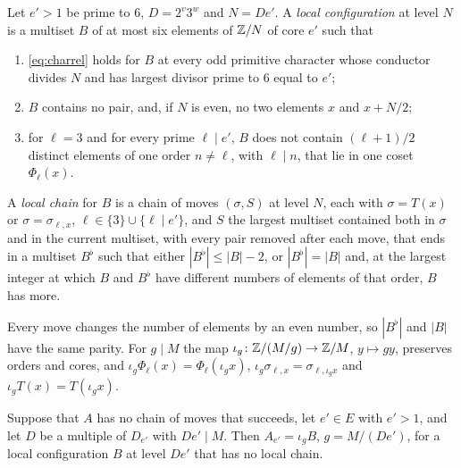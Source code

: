 \begin{definition}\label{def:localconf}
Let $e'>1$ be prime to $6$, $D=2^{v}3^{w}$ and $N=De'$. A \emph{local
configuration} at level $N$ is a multiset $B$ of at most six elements of
$\mathbb{Z}/N$ of core $e'$ such that
\begin{enumerate}[label=\textup{(\roman*)}]
\item \eqref{eq:charrel} holds for $B$ at every odd primitive character
whose conductor divides $N$ and has largest divisor prime to $6$ equal to
$e'$;
\item $B$ contains no pair, and, if $N$ is even, no two elements $x$ and
$x+N/2$;
\item for $\ell=3$ and for every prime $\ell\mid e'$, $B$ does not contain
$(\ell+1)/2$ distinct elements of one order $n\ne\ell$, with $\ell\mid n$,
that lie in one coset $\Phi_{\ell}(x)$.
\end{enumerate}
A \emph{local chain} for $B$ is a chain of moves $(\sigma,S)$ at level $N$,
each with $\sigma=T(x)$ or $\sigma=\sigma_{\ell,x}$, $\ell\in\{3\}\cup
\{\ell\mid e'\}$, and $S$ the largest multiset contained both in $\sigma$ and in
the current multiset, with every pair removed after each move, that ends in a multiset
$B^{\flat}$ such that either $|B^{\flat}|\le|B|-2$, or $|B^{\flat}|=|B|$ and,
at the largest integer at which $B$ and $B^{\flat}$ have different numbers of
elements of that order, $B$ has more.
\end{definition}

Every move changes the number of elements by an even number, so $|B^{\flat}|$
and $|B|$ have the same parity. For $g\mid M$ the map $\iota_{g}\colon
\mathbb{Z}/(M/g)\to\mathbb{Z}/M$, $y\mapsto gy$, preserves orders and cores, and
$\iota_{g}\Phi_{\ell}(x)=\Phi_{\ell}(\iota_{g}x)$, $\iota_{g}\sigma_{\ell,x}=
\sigma_{\ell,\iota_{g}x}$ and $\iota_{g}T(x)=T(\iota_{g}x)$.

\begin{lemma}\label{lem:local}
Suppose that $A$ has no chain of moves that succeeds, let $e'\in E$ with
$e'>1$, and let $D$ be a multiple of $D_{e'}$ with $De'\mid M$. Then
$A_{e'}=\iota_{g}B$, $g=M/(De')$, for a local configuration $B$ at level
$De'$ that has no local chain.
\end{lemma}

